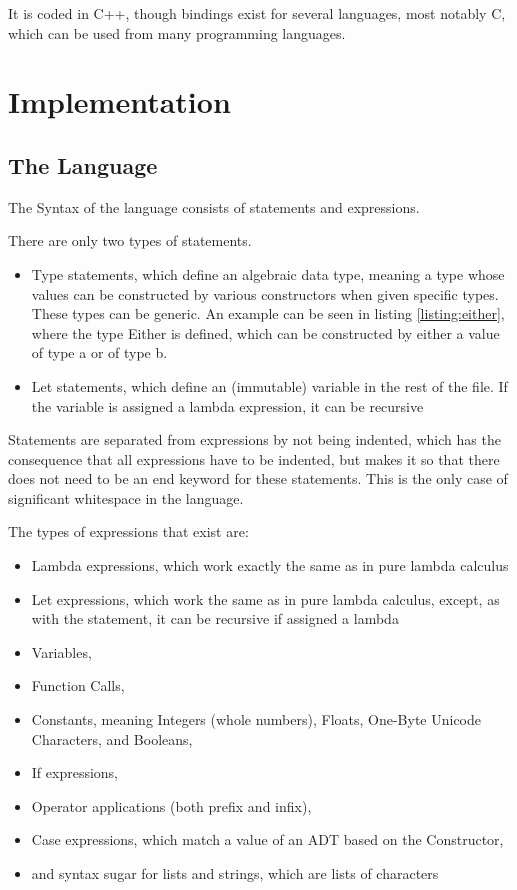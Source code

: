 \documentclass[12pt]{article}
\begin{document}
It is coded in C++, though bindings exist for several languages, most notably
C, which can be used from many programming languages.

\section{Implementation}

\subsection{The Language}



The Syntax of the language consists of statements and expressions.

There are only two types of statements.
\begin{itemize}
      \item Type statements, which define an algebraic data type,
            meaning a type whose values can be constructed by various
            constructors when given specific types.
            These types can be generic.
            An example can be seen in listing \ref{listing:either}, where the type Either is defined,
            which can be constructed by either a value of type a or of type b.
      \item Let statements, which define an (immutable) variable
            in the rest of the file. If the variable is assigned a
            lambda expression, it can be recursive
\end{itemize}
Statements are separated from expressions by not being indented,
which has the consequence that all expressions have to be indented,
but makes it so that there does not need to be an end keyword
for these statements.
This is the only case of significant whitespace in the language.

The types of expressions that exist are:
\begin{itemize}
      \item Lambda expressions, which work exactly
            the same as in pure lambda calculus
      \item Let expressions, which work the same as in pure
            lambda calculus, except, as with the statement,
            it can be recursive if assigned a lambda
      \item Variables,
      \item Function Calls,
      \item Constants, meaning Integers (whole numbers), Floats,
            One-Byte Unicode Characters, and Booleans,
      \item If expressions,
      \item Operator applications (both prefix and infix),
      \item Case expressions, which match a value of an ADT
            based on the Constructor,
      \item and syntax sugar for lists and strings,
            which are lists of characters
\end{itemize}
\end{document}

